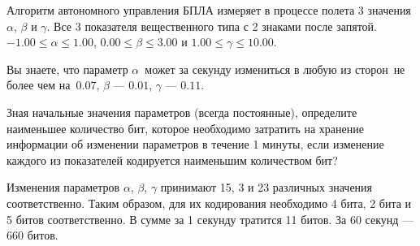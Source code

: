 
Алгоритм автономного управления БПЛА измеряет в процессе полета 3 значения $\alpha$, $\beta$ и $\gamma$. Все 3 показателя вещественного типа с 2 знаками после запятой. $-1.00\leq \alpha\leq 1.00$, $0.00\leq\beta\leq 3.00$ и $1.00\leq\gamma\leq10.00$.

Вы знаете, что параметр $\alpha$ может за секунду измениться в любую из сторон не более чем на $0.07$, $\beta$ — $0.01$, $\gamma$ — $0.11$.

Зная начальные значения параметров (всегда постоянные), определите наименьшее количество бит, которое необходимо затратить на хранение информации об изменении параметров в течение 1 минуты, если изменение каждого из показателей кодируется наименьшим количеством бит?

\solutionSection

Изменения параметров $\alpha$, $\beta$, $\gamma$ принимают 15, 3 и 23 различных значения соответственно. Таким образом, для их кодирования необходимо 4 бита, 2 бита и 5 битов соответственно. В сумме за 1 секунду тратится 11 битов. За 60 секунд — 660 битов. 

